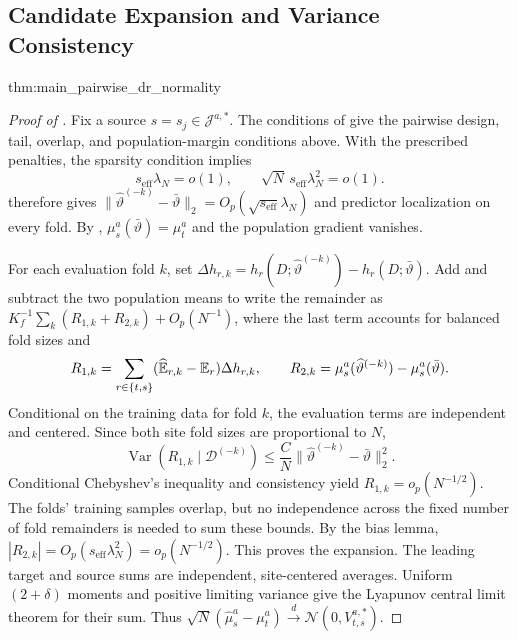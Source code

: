 \documentclass[12pt]{article}
\providecommand{\En}{\widehat{\mathbb E}}
\begin{document}
\subsection{Candidate Expansion and Variance Consistency}\label{supp:pairwise_main_proof}
\begin{restatedmain}{thm:main_pairwise_dr_normality}
\FACEHDSourceExpansion
\end{restatedmain}
\label{proof:main_source_expansion}
\begin{proof}[Proof of ]
Fix a source $s=s_j\in\mathcal J^{a,*}$. The conditions of  give the pairwise design, tail, overlap, and population-margin conditions above. With the prescribed penalties, the sparsity condition implies
\begin{equation}\label{eq:inference_rate_conditions}
s_{\mathrm{eff}}\lambda_N=o(1),\qquad
\sqrt N\,s_{\mathrm{eff}}\lambda_N^2=o(1).
\end{equation}
 therefore gives $\|\widehat\vartheta^{(-k)}-\bar\vartheta\|_2=O_p(\sqrt{s_{\mathrm{eff}}}\lambda_N)$ and predictor localization on every fold. By , $\mu_s^a(\bar\vartheta)=\mu_t^a$ and the population gradient vanishes.

For each evaluation fold $k$, set $\Delta h_{r,k}=h_r(D;\widehat\vartheta^{(-k)})-h_r(D;\bar\vartheta)$. Add and subtract the two population means to write the remainder as $K_f^{-1}\sum_k(R_{1,k}+R_{2,k})+O_p(N^{-1})$, where the last term accounts for balanced fold sizes and
\[
R_{1,k}=\sum_{r\in\{t,s\}}(\En_{r,k}-\E_r)\Delta h_{r,k},
\qquad R_{2,k}=\mu_s^a(\widehat\vartheta^{(-k)})-\mu_s^a(\bar\vartheta).
\]
Conditional on the training data for fold $k$, the evaluation terms are independent and centered. Since both site fold sizes are proportional to $N$,
\[
\operatorname{Var}(R_{1,k}\mid\mathcal D^{(-k)})
\le\frac C N\|\widehat\vartheta^{(-k)}-\bar\vartheta\|_2^2.
\]
Conditional Chebyshev's inequality and consistency yield $R_{1,k}=o_p(N^{-1/2})$. The folds' training samples overlap, but no independence across the fixed number of fold remainders is needed to sum these bounds. By the bias lemma, $|R_{2,k}|=O_p(s_{\mathrm{eff}}\lambda_N^2)=o_p(N^{-1/2})$.
This proves the expansion. The leading target and source sums are independent, site-centered averages. Uniform $(2+\delta)$ moments and positive limiting variance give the Lyapunov central limit theorem for their sum. Thus $\sqrt N(\widehat\mu_s^a-\mu_t^a)\xrightarrow{d}\mathcal N(0,V_{t,s}^{a,*})$.


\end{proof}
\end{document}
